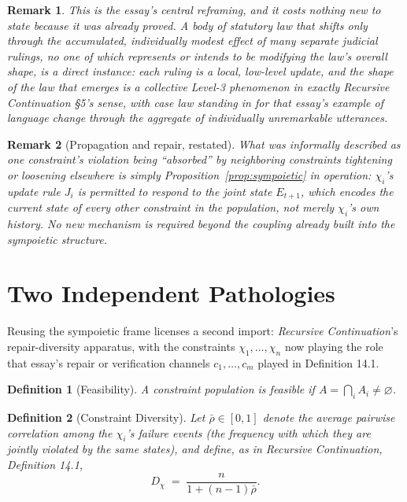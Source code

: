 \documentclass[11pt]{article}
\newtheorem{definition}{Definition}[section]
\newtheorem*{remark}{Remark}
\begin{document}
\begin{remark}
This is the essay's central reframing, and it costs nothing new to state because it was already proved. A body of statutory law that shifts only through the accumulated, individually modest effect of many separate judicial rulings, no one of which represents or intends to be modifying the law's overall shape, is a direct instance: each ruling is a local, low-level update, and the shape of the law that emerges is a collective Level-3 phenomenon in exactly \emph{Recursive Continuation} \S 5's sense, with case law standing in for that essay's example of language change through the aggregate of individually unremarkable utterances.
\end{remark}

\begin{remark}[Propagation and repair, restated]
What was informally described as one constraint's violation being ``absorbed'' by neighboring constraints tightening or loosening elsewhere is simply Proposition~\ref{prop:sympoietic} in operation: $\chi_i$'s update rule $J_i$ is permitted to respond to the joint state $E_{t+1}$, which encodes the current state of every other constraint in the population, not merely $\chi_i$'s own history. No new mechanism is required beyond the coupling already built into the sympoietic structure.
\end{remark}

\section{Two Independent Pathologies}

Reusing the sympoietic frame licenses a second import: \emph{Recursive Continuation}'s repair-diversity apparatus, with the constraints $\chi_1,\dots,\chi_n$ now playing the role that essay's repair or verification channels $c_1,\dots,c_m$ played in Definition 14.1.

\begin{definition}[Feasibility]
A constraint population is \emph{feasible} if $A = \bigcap_i A_i \neq \varnothing$.
\end{definition}

\begin{definition}[Constraint Diversity]
Let $\bar\rho\in[0,1]$ denote the average pairwise correlation among the $\chi_i$'s failure events (the frequency with which they are jointly violated by the same states), and define, as in \emph{Recursive Continuation}, Definition 14.1,
\[
D_\chi \;=\; \frac{n}{1+(n-1)\bar\rho}.
\]
\end{definition}
\end{document}
